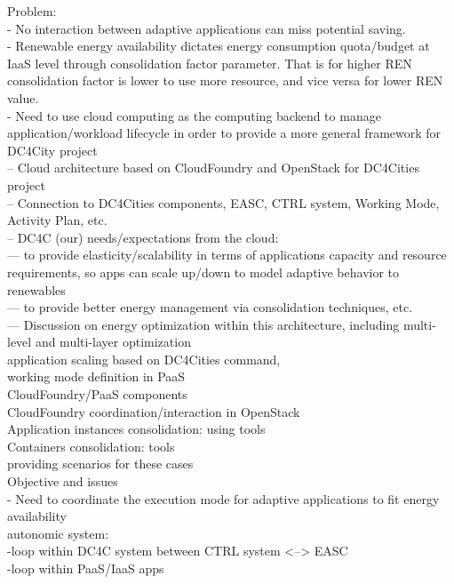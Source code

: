 Problem: \\
- No interaction between adaptive applications can miss potential saving. \\
- Renewable energy availability dictates energy consumption quota/budget at IaaS level through consolidation factor parameter. That is for higher REN consolidation factor is lower to use more resource, and vice versa for lower REN value. \\
- Need to use cloud computing as the computing backend to manage application/workload lifecycle in order to provide a more general framework for DC4City project \\
-- Cloud architecture based on CloudFoundry and OpenStack for DC4Cities project \\
-- Connection to DC4Cities components, EASC, CTRL system, Working Mode, Activity Plan, etc. \\
-- DC4C (our) needs/expectations from the cloud: \\
--- to provide elasticity/scalability in terms of applications capacity and resource requirements, so apps can scale up/down to model adaptive behavior to renewables \\
--- to provide better energy management via consolidation techniques, etc. \\
--- Discussion on energy optimization within this architecture, including multi-level and multi-layer optimization \\


application scaling based on DC4Cities command, \\
working mode definition in PaaS \\

CloudFoundry/PaaS components \\

CloudFoundry coordination/interaction in OpenStack \\
Application instances consolidation: using tools \\
Containers consolidation: tools \\


providing scenarios for these cases \\
Objective and issues \\
- Need to coordinate the execution mode for adaptive applications to fit energy availability \\
autonomic system: \\
-loop within DC4C system between CTRL system <--> EASC \\
-loop within PaaS/IaaS apps \\
		
